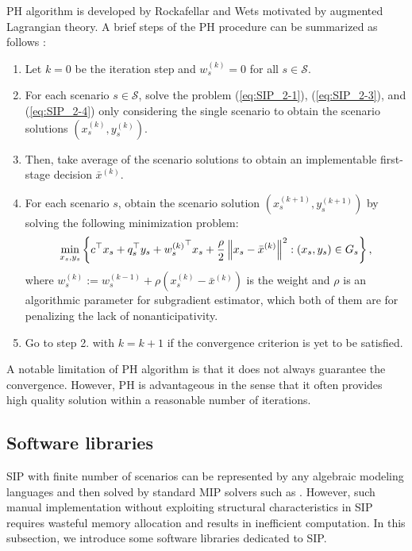 PH algorithm is developed by Rockafellar and Wets \cite{journal:RW1991} motivated by augmented Lagrangian theory. 
A brief steps of the PH procedure can be summarized as follows \cite{book:pyomo}:
\begin{enumerate}
	\item Let $k=0$ be the iteration step and $w_s^{(k)}=0$ for all $s\in\mathcal{S}$.
	\item For each scenario $s\in\mathcal{S}$, solve the problem (\ref{eq:SIP_2-1}), (\ref{eq:SIP_2-3}), and (\ref{eq:SIP_2-4}) only considering the single scenario to obtain the scenario solutions $(x_s^{(k)},y_s^{(k)})$.
	\item Then, take average of the scenario solutions to obtain an implementable first-stage decision $\bar{x}^{(k)}$.
	\item For each scenario $s$, obtain the scenario solution $(x_s^{(k+1)},y_s^{(k+1)})$ by solving the following minimization problem:
	\begin{align*}
	\min_{x_s,y_s}\left\{c^\top x_s+q_s^\top y_s + {w_s^{(k)}}^\top x_s +\frac{\rho}{2}\left\lVert x_s-\bar{x}^{(k)}\right\rVert^2 : (x_s,y_s)\in G_s \right\},
	\end{align*}
	where ${w_s^{(k)}}:={w_s^{(k-1)}}+\rho(x_s^{(k)}-\bar{x}^{(k)})$ is the weight and $\rho$ is an algorithmic parameter for subgradient estimator, which both of them are for penalizing the lack of nonanticipativity.
	\item Go to step 2. with $k=k+1$ if the convergence criterion is yet to be satisfied. 
\end{enumerate}
A notable limitation of PH algorithm is that it does not always guarantee the convergence. However, PH is advantageous in the sense that it often provides high quality solution within a reasonable number of iterations. 
\subsection{Software libraries}
SIP with finite number of scenarios can be represented by any algebraic modeling languages and then solved by standard MIP solvers such as \cplex. However, such manual implementation without exploiting structural characteristics in SIP requires wasteful memory allocation and results in inefficient computation. In this subsection, we introduce some software libraries dedicated to SIP.

